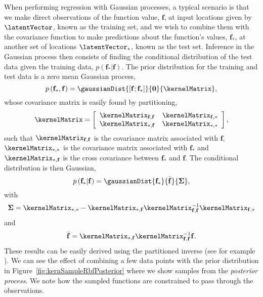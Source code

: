 When performing regression with Gaussian processes, a typical scenario is
that we make direct observations of the function value, $\mathbf{f}$,
at input locations given by $\latentVector$, known as the training set,
and we wish to combine them with the covariance function to make
predictions about the function's values, $\mathbf{f}_{*}$, at another
set of locations $\latentVector_{*}$, known as the test set.  Inference
in the Gaussian process then consists of finding the conditional
distribution of the test data given the training data,
$p\left(\mathbf{f}_{*}|\mathbf{f}\right)$. The prior distribution for
the training and test data is a zero mean Gaussian process,
\[
p\left(\mathbf{f}_{*},\mathbf{f}\right) = \gaussianDist{\left[\mathbf{f};
  \mathbf{f}_{*}\right]}{\mathbf{0}}{\kernelMatrix},
\]
whose covariance matrix is easily found by partitioning,
\[
\kernelMatrix=\left[\begin{array}{cc}
    \kernelMatrix_{\mathbf{f},\mathbf{f}} & \kernelMatrix_{\mathbf{f},*}\\
    \kernelMatrix_{*,\mathbf{f}} &
    \kernelMatrix_{\mathbf{*,*}}\end{array}\right],
\] 
such that $\kernelMatrix_{\mathbf{f},\mathbf{f}}$ is the
covariance matrix associated with $\mathbf{f}$,
$\kernelMatrix_{*,*}$ is the covariance matrix associated with
$\mathbf{f}_{*}$ and $\kernelMatrix_{*,\mathbf{f}}$ is the cross
covariance between $\mathbf{f}_{*}$ and $\mathbf{f}$.  The conditional
distribution is then Gaussian, 
\[
p\left(\mathbf{f}_{*}|\mathbf{f}\right)=\gaussianDist{\mathbf{f}_{*}}{\bar{\mathbf{f}}}{\boldsymbol{\Sigma}},
\] 
with
\[
\boldsymbol{\Sigma}=\kernelMatrix_{*,*}-\kernelMatrix_{*,\mathbf{f}}\kernelMatrix_{\mathbf{f},\mathbf{f}}^{-1}\kernelMatrix_{\mathbf{f},*}
\]
and
\[
\bar{\mathbf{f}}=\kernelMatrix_{*,\mathbf{f}}\kernelMatrix_{\mathbf{f},\mathbf{f}}^{-1}\mathbf{f}.
\]
These results can be easily derived using the partitioned inverse (see
for example \citet{Anderson:stats03}). We can see the effect of
combining a few data points with the prior distribution in
Figure~\ref{fig:kernSampleRbfPosterior} where we show samples from the
\emph{posterior process}. We note how the sampled functions are
constrained to pass through the observations.

